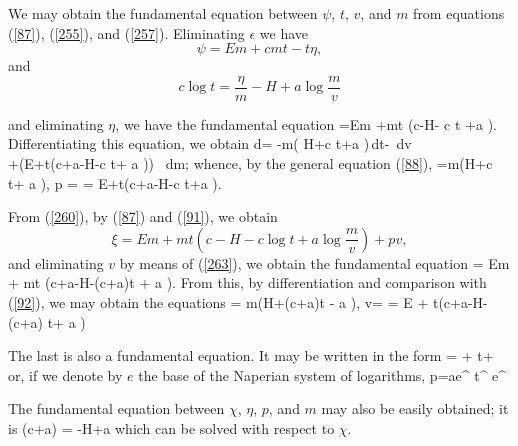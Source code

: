 \documentclass[12pt]{article}
\begin{document}
We may obtain the fundamental equation between $\psi$, $t$, $v$, and $m$ from equations (\ref{87}), (\ref{255}), and (\ref{257}). Eliminating $\epsilon$ we have
$$\psi = Em + cmt - t\eta,$$
and                 $$c \log t =\frac{\eta}{m} -H + a \log \frac{m}{v}$$

and eliminating $\eta$, we have the fundamental equation
\eqs \psi =Em +mt \left(c-H- c \log t +a \log {}  \right). \label{260}\eqe
Differentiating this equation, we obtain
\eqs d\psi = -m\left( H+c \log t+a \log {}\right)\,dt-  \,dv\\
+\left(E+t\left(c+a-H-c \log t+ a \log {}\right)\right) \, dm; \label{261}\eqe
whence, by the general equation (\ref{88}),
\eqs \eta=m\left(H+c \log t+ a \log {}\right), \label{262}\eqe
\eqs p =  \label{263}\eqe
\eqs \mu = E+t\left(c+a-H-c \log t+a \log {} \right).  \label{264}\eqe

From (\ref{260}), by (\ref{87}) and (\ref{91}), we obtain
$$ \xi = E m + mt \left(c-H -c \log t+ a \log \frac{m}{v} \right) +pv,$$
and eliminating $v$ by means of (\ref{263}), we obtain the fundamental equation
\eqs \xi = Em + mt \left(c+a-H-(c+a)\log t + a \log{} \right).  \label{265}\eqe
From this, by differentiation and comparison with (\ref{92}), we may obtain the equations
\eqs \eta = m\left(H+(c+a)\log t - a \log {}\right),  \label{266}\eqe
\eqs v=       \label{267}\eqe
\eqs \mu = E + t\left(c+a-H-(c+a) \log t+ a \log {}\right)  \label{268}\eqe


The last is also a fundamental equation. It may be written in the form
\eqs \log{}=   +  \log t+  \label{269}\eqe
or, if we denote by $e$ the base of the Naperian system of logarithms,
\eqs 
p=ae^{} t^{} e^{} \label{270}\eqe


The fundamental equation between $\chi$, $\eta$, $p$, and $m$ may also be
easily obtained; it is
\eqs (c+a) \log {} =  -H+a \log {} \label{271}\eqe
which can be solved with respect to $\chi$.
\end{document}

